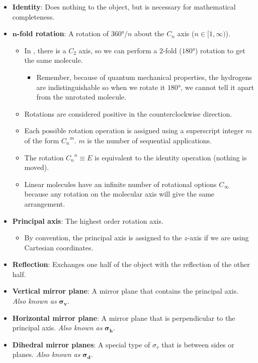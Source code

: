 \documentclass[../main.tex]{subfiles}
\begin{document}
\begin{itemize}
    \item \textbf{Identity}: Does nothing to the object, but is necessary for mathematical completeness.
    \item \textbf{$\bm{n}$-fold rotation}: A rotation of $\ang{360}/n$ about the $C_n$ axis ($n\in[1,\infty)$).
    \begin{itemize}
        \item In , there is a $C_2$ axis, so we can perform a $2$-fold ($\ang{180}$) rotation to get the same molecule.
        \begin{itemize}
            \item Remember, because of quantum mechanical properties, the hydrogens are indistinguishable so when we rotate it $\ang{180}$, we cannot tell it apart from the unrotated molecule.
        \end{itemize}
        \item Rotations are considered positive in the counterclockwise direction.
        \item Each possible rotation operation is assigned using a superscript integer $m$ of the form ${C_n}^m$. $m$ is the number of sequential applications.
        \item The rotation ${C_n}^n\equiv E$ is equivalent to the identity operation (nothing is moved).
        \item Linear molecules have an infinite number of rotational options $C_\infty$ because any rotation on the molecular axis will give the same arrangement.
    \end{itemize}
    \item \textbf{Principal axis}: The highest order rotation axis.
    \begin{itemize}
        \item By convention, the principal axis is assigned to the $z$-axis if we are using Cartesian coordinates.
    \end{itemize}
    \item \textbf{Reflection}: Exchanges one half of the object with the reflection of the other half.
    \item \textbf{Vertical mirror plane}: A mirror plane that contains the principal axis. \emph{Also known as} $\bm{\sigma_v}$.
    \item \textbf{Horizontal mirror plane}: A mirror plane that is perpendicular to the principal axis. \emph{Also known as} $\bm{\sigma_h}$.
    \item \textbf{Dihedral mirror planes}: A special type of $\sigma_v$ that is between sides or planes. \emph{Also known as} $\bm{\sigma_d}$.

\end{itemize}
\end{document}
